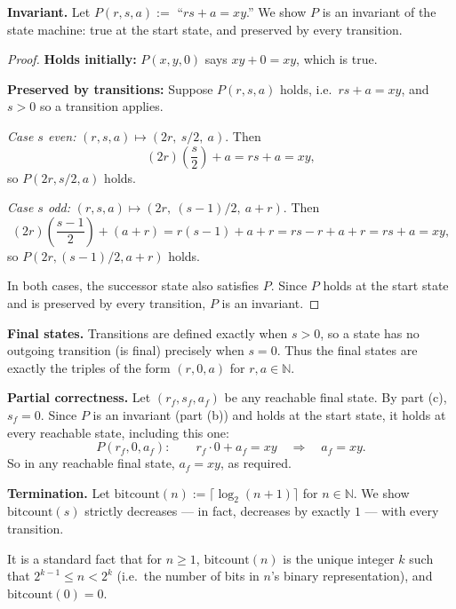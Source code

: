 \documentclass[11pt]{article}
\newcommand{\N}{\mathbb{N}}
\newcommand{\partlabel}[1]{%
    \noindent\makebox[2em][l]{\textbf{(#1)}}%
}
\begin{document}
\medskip
\partlabel{b}
\textbf{Invariant.} Let $P(r,s,a) := $ ``$rs + a = xy$.'' We show $P$ is an invariant of the state machine: true at the start state, and preserved by every transition.

\begin{proof}
\textbf{Holds initially:} $P(x,y,0)$ says $xy + 0 = xy$, which is true.

\textbf{Preserved by transitions:} Suppose $P(r,s,a)$ holds, i.e.\ $rs+a = xy$, and $s > 0$ so a transition applies.

\emph{Case $s$ even:} $(r,s,a) \mapsto (2r,\ s/2,\ a)$. Then
\[
(2r)\left(\frac{s}{2}\right) + a = rs + a = xy,
\]
so $P(2r,s/2,a)$ holds.

\emph{Case $s$ odd:} $(r,s,a) \mapsto (2r,\ (s-1)/2,\ a+r)$. Then
\[
(2r)\left(\frac{s-1}{2}\right) + (a+r) = r(s-1) + a + r = rs - r + a + r = rs+a = xy,
\]
so $P(2r,(s-1)/2,a+r)$ holds.

In both cases, the successor state also satisfies $P$. Since $P$ holds at the start state and is preserved by every transition, $P$ is an invariant.
\end{proof}

\medskip
\partlabel{c}
\textbf{Final states.} Transitions are defined exactly when $s > 0$, so a state has no outgoing transition (is final) precisely when $s = 0$. Thus the final states are exactly the triples of the form $(r, 0, a)$ for $r, a \in \N$.

\medskip
\partlabel{d}
\textbf{Partial correctness.} Let $(r_f, s_f, a_f)$ be any reachable final state. By part (c), $s_f = 0$. Since $P$ is an invariant (part (b)) and holds at the start state, it holds at every reachable state, including this one:
\[
P(r_f, 0, a_f):\qquad r_f \cdot 0 + a_f = xy \quad\Longrightarrow\quad a_f = xy.
\]
So in any reachable final state, $a_f = xy$, as required.

\medskip
\partlabel{e}
\textbf{Termination.} Let $\mathrm{bitcount}(n) := \lceil \log_2(n+1) \rceil$ for $n \in \N$. We show $\mathrm{bitcount}(s)$ strictly decreases — in fact, decreases by exactly $1$ — with every transition.

It is a standard fact that for $n \ge 1$, $\mathrm{bitcount}(n)$ is the unique integer $k$ such that $2^{k-1} \le n < 2^k$ (i.e.\ the number of bits in $n$'s binary representation), and $\mathrm{bitcount}(0) = 0$.
\end{document}
